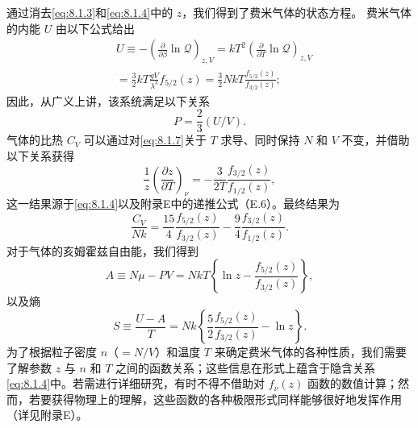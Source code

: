 通过消去\autoref{eq:8.1.3}和\autoref{eq:8.1.4}中的 \(z\)，我们得到了费米气体的状态方程。
费米气体的内能 \(U\) 由以下公式给出
\begin{equation}\tag{8.1.7}\label{eq:8.1.7}
\begin{array}{rl} & { U \equiv - \left( \frac { \partial } { \partial \beta } \ln \mathcal { Q } \right) _ { z , V } = k T ^{2} \left( \frac { \partial } { \partial T } \ln \mathcal { Q } \right) _ { z , V } } \\& { = \frac { 3 } { 2 } k T \frac { g V } { \lambda ^{3} } f _ { 5 / 2 } ( z ) = \frac { 3 } { 2 } N k T \frac { f _ { 5 / 2 } ( z ) } { f _ { 3 / 2 } ( z ) } ; } \end{array}
\end{equation}
因此，从广义上讲，该系统满足以下关系
\begin{equation}\tag{8.1.8}\label{eq:8.1.8}
P = \frac { 2 } { 3 } ( U / V ) .
\end{equation}
气体的比热 \(C_{V}\) 可以通过对\autoref{eq:8.1.7}关于 \(T\) 求导、同时保持 \(N\) 和 \(V\) 不变，并借助以下关系获得
\begin{equation}\tag{8.1.9}\label{eq:8.1.9}
\frac { 1 } { z } \left( \frac { \partial z } { \partial T } \right) _ { \nu } = - \frac { 3 } { 2 T } \frac { f _ { 3 / 2 } ( z ) } { f _ { 1 / 2 } ( z ) } ,
\end{equation}
这一结果源于\autoref{eq:8.1.4}以及附录E中的递推公式（E.6）。最终结果为
\begin{equation}\tag{8.1.10}\label{eq:8.1.10}
\frac { C _ { V } } { N k } = \frac { 15 } { 4 } \frac { f _ { 5 / 2 } ( z ) } { f _ { 3 / 2 } ( z ) } - \frac { 9 } { 4 } \frac { f _ { 3 / 2 } ( z ) } { f _ { 1 / 2 } ( z ) } .
\end{equation}
对于气体的亥姆霍兹自由能，我们得到
\begin{equation}\tag{8.1.11}\label{eq:8.1.11}
A \equiv N \mu - P V = N k T \left\{ \ln z - \frac { f _ { 5 / 2 } ( z ) } { f _ { 3 / 2 } ( z ) } \right\} ,
\end{equation}
以及熵
\begin{equation}\tag{8.1.12}\label{eq:8.1.12}
S \equiv \frac { U - A } { T } = N k \left\{ \frac { 5 } { 2 } \frac { f _ { 5 / 2 } ( z ) } { f _ { 3 / 2 } ( z ) } - \ln z \right\} .
\end{equation}
为了根据粒子密度 \(n\)（\(= N/V\)）和温度 \(T\) 来确定费米气体的各种性质，我们需要了解参数 \(z\) 与 \(n\) 和 \(T\) 之间的函数关系；这些信息在形式上蕴含于隐含关系\autoref{eq:8.1.4}中。若需进行详细研究，有时不得不借助对 \(f_{\nu}(z)\) 函数的数值计算；然而，若要获得物理上的理解，这些函数的各种极限形式同样能够很好地发挥作用（详见附录E）。
